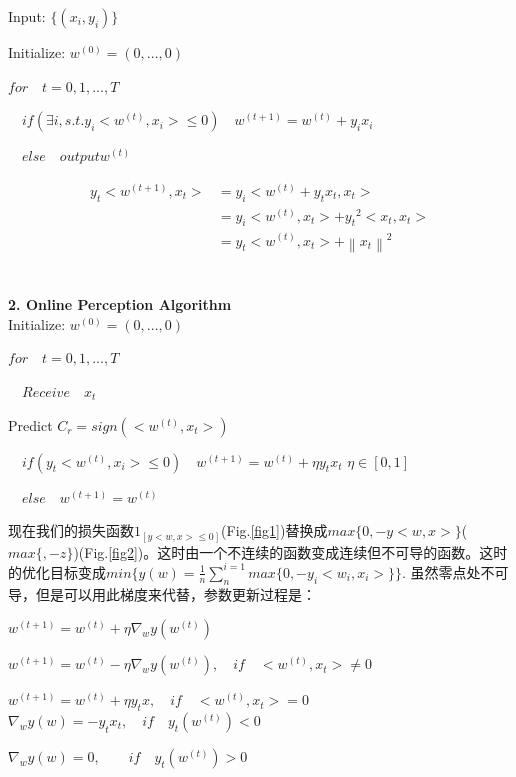 \documentclass[12pt,UTF8,AutoFakeBold]{article}
\begin{document}
Input: \(\{(x_i,y_i)\}\)

Initialize: \(w^{(0)}=(0,...,0)\)

\(for \quad t=0,1,...,T\)

\(\quad if (\exists i, s.t. y_i<w^{(t)}, x_i>\le 0) \quad w^{(t+1)}=w^{(t)}+y_ix_i\)

\(\quad else \quad output w^{(t)} \)


\begin{equation}
\begin{aligned}
y_t<w^{(t+1)},x_t>&=y_i<w^{(t)}+y_tx_t,x_t>\\
&=y_i<w^{(t)},x_t>+{y_t}^2<x_t,x_t>\\
&=y_t<w^{(t)},x_t>+{\left\| x_t \right\|}^2
\end{aligned}
\end{equation}\\
\\
\textbf{2. Online Perception Algorithm}\\

Initialize: \(w^{(0)}=(0,...,0)\)

\(for \quad t=0,1,...,T\)

\(\quad Receive \quad x_t\)

\quad Predict \(C_r = sign(<w^{(t)},x_t>)\)

\(\quad if (y_t<w^{(t)}, x_i>\le 0) \quad w^{(t+1)}=w^{(t)}+\eta y_tx_t\)  \(\eta \in [0,1]\)

\(\quad else \quad w^{(t+1)}=w^{(t)} \)

现在我们的损失函数\(1_{[y<w,x>\le 0]}\)(Fig.\ref{fig1})替换成\(max\{0, -y<w,x>\}\)(\(max\{, -z\}\))(Fig.\ref{fig2})。这时由一个不连续的函数变成连续但不可导的函数。这时的优化目标变成\(min\{y(w)=\frac{1}{n}\sum _{n}^{i=1}{max\{0, -y_i<w_i,x_i>\}} \}\). 虽然零点处不可导，但是可以用此梯度来代替，参数更新过程是：

\(w^{ (t+1) }=w^{ (t) }+\eta { \nabla  }_{ w }y({ w }^{ (t) })\)

\(w^{ (t+1) }=w^{ (t) }-\eta { \nabla  }_{ w }y({ w }^{ (t) }),\quad if\quad <w^{ (t) },{ x }_{ t }>\neq 0\)

\(w^{ (t+1) }=w^{ (t) }+\eta { y }_{ t }{ x },\quad if\quad <w^{ (t) },{ x }_{ t }>=0\)
\({{\nabla}_{w}y({w})=-y}_{t}{x}_{t},\quad if\quad {y}_{t}(w^{(t)})<0\)

\({\nabla}_{w}y({w})=0, \quad \quad if\quad {y}_{t}(w^{(t)})>0\)
\end{document}
